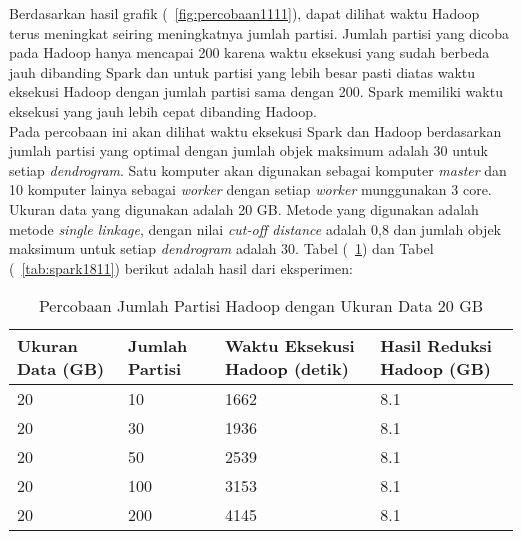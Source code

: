Berdasarkan hasil grafik (~\ref{fig:percobaan1111}), dapat dilihat waktu Hadoop terus meningkat seiring meningkatnya jumlah partisi. Jumlah partisi yang dicoba pada Hadoop hanya mencapai 200 karena waktu eksekusi yang sudah berbeda jauh dibanding Spark dan untuk partisi yang lebih besar pasti diatas waktu eksekusi Hadoop dengan jumlah partisi sama dengan 200. Spark memiliki waktu eksekusi yang jauh lebih cepat dibanding Hadoop. \\




Pada percobaan ini akan dilihat waktu eksekusi Spark dan Hadoop berdasarkan jumlah partisi yang optimal dengan jumlah objek maksimum adalah 30 untuk setiap \textit{dendrogram}. Satu komputer akan digunakan sebagai komputer \textit{master} dan 10 komputer lainya sebagai \textit{worker} dengan setiap \textit{worker} munggunakan 3 core. Ukuran data yang digunakan adalah 20 GB. Metode yang digunakan adalah metode \textit{single linkage}, dengan nilai \textit{cut-off distance} adalah 0,8 dan jumlah objek maksimum untuk setiap \textit{dendrogram} adalah 30. Tabel (~\ref{tab:spark1711}) dan Tabel (~\ref{tab:spark1811}) berikut adalah hasil dari eksperimen:





\begin{table}[H] 
	\centering 
	\caption{Percobaan Jumlah Partisi Hadoop dengan Ukuran Data 20 GB}
	\label{tab:spark1711}
	\begin{tabular}{|p{3cm}|p{3cm}|p{4cm}|p{4cm}|}
\hline
Ukuran Data (GB) & Jumlah Partisi &  Waktu Eksekusi Hadoop (detik) & Hasil Reduksi Hadoop (GB)\\
\hline
20 & 10 & 1662  & 8.1  \\
\hline
20 & 30 & 1936  & 8.1  \\
\hline
20 & 50 & 2539  & 8.1  \\
\hline
20 & 100 & 3153  & 8.1  \\
\hline
20 & 200 & 4145  & 8.1  \\
\hline


\hline

	\end{tabular} 
\end{table}




